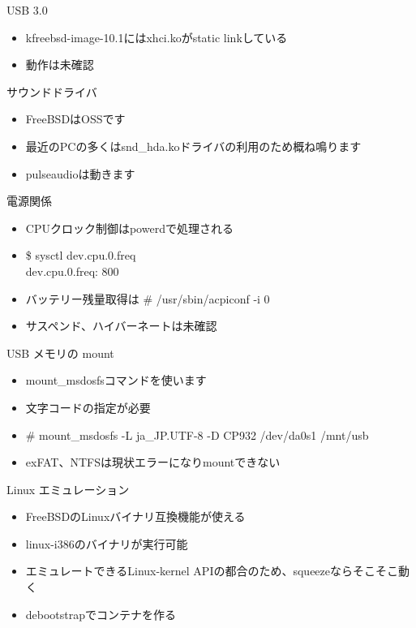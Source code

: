 \begin{frame}[containsverbatim]{USB 3.0}
  \begin{itemize}

  \item kfreebsd-image-10.1にはxhci.koがstatic linkしている
  \item 動作は未確認
  \end{itemize}
\end{frame}


\begin{frame}[containsverbatim]{サウンドドライバ}
  \begin{itemize}
  \item FreeBSDはOSSです
  \item 最近のPCの多くはsnd\_hda.koドライバの利用のため概ね鳴ります
  \item pulseaudioは動きます
  \end{itemize}
\end{frame}


\begin{frame}[containsverbatim]{電源関係}
  \begin{itemize}
  \item CPUクロック制御はpowerdで処理される
  \item \$ sysctl dev.cpu.0.freq \\
    dev.cpu.0.freq: 800
  \item バッテリー残量取得は \# /usr/sbin/acpiconf -i 0
  \item サスペンド、ハイバーネートは未確認
  \end{itemize}
\end{frame}


\begin{frame}[containsverbatim]{USB メモリの mount}
  \begin{itemize}
  \item mount\_msdosfsコマンドを使います
  \item 文字コードの指定が必要
  \item \# mount\_msdosfs -L ja\_JP.UTF-8 -D CP932 /dev/da0s1 /mnt/usb
  \item exFAT、NTFSは現状エラーになりmountできない
  \end{itemize}
\end{frame}


\begin{frame}[containsverbatim]{Linux エミュレーション}
  \begin{itemize}
  \item FreeBSDのLinuxバイナリ互換機能が使える
  \item linux-i386のバイナリが実行可能
  \item エミュレートできるLinux-kernel APIの都合のため、squeezeならそこそこ動く
  \item debootstrapでコンテナを作る
  \end{itemize}
\end{frame}


